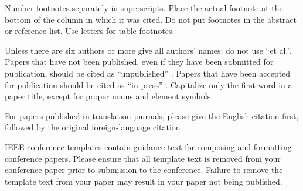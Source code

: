 \documentclass[conference]{IEEEtran}
\begin{document}
Number footnotes separately in superscripts. Place the actual footnote at 
the bottom of the column in which it was cited. Do not put footnotes in the 
abstract or reference list. Use letters for table footnotes.

Unless there are six authors or more give all authors' names; do not use 
``et al.''. Papers that have not been published, even if they have been 
submitted for publication, should be cited as ``unpublished''   . Papers 
that have been accepted for publication should be cited as ``in press''  . 
Capitalize only the first word in a paper title, except for proper nouns and 
element symbols.

For papers published in translation journals, please give the English 
citation first, followed by the original foreign-language citation




\vspace{12pt}
\color{red}
IEEE conference templates contain guidance text for composing and formatting conference papers. Please ensure that all template text is removed from your conference paper prior to submission to the conference. Failure to remove the template text from your paper may result in your paper not being published.
\end{document}
